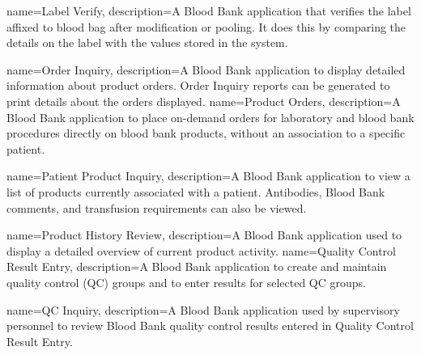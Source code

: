
\newcommand{\bbappitem}[1]{\item \appicon{bb/#1}  {{\Large{\boldcap{\gls{#1}}}}\\}\glsdesc{#1} }


{
    name={Label Verify},
    description={A Blood Bank application that verifies the label affixed to blood bag after modification or pooling. It does this by comparing the details on the label with the values stored in the system.}
}


{
  name={Order Inquiry},
  description={A Blood Bank application to display detailed information about product orders. Order Inquiry reports can be generated to print details about the orders displayed.}
}
{
  name={Product Orders},
  description={A Blood Bank application to place on-demand orders for laboratory and blood bank procedures directly on blood bank products, without an association to a specific patient.}
}

{
  name={Patient Product Inquiry},
  description={A Blood Bank application to view a list of products currently associated with a patient. Antibodies, Blood Bank comments, and transfusion requirements can also be viewed.}
}

{
  name={Product History Review},
  description={A Blood Bank application used to display a detailed overview of current product activity.}
}
{
  name={Quality Control Result Entry},
  description={A Blood Bank application to create and maintain quality control (QC) groups and to enter results for selected QC groups.}
}

{
  name={QC Inquiry},
  description={A Blood Bank application used by supervisory personnel to review Blood Bank quality control results entered in Quality Control Result Entry.}
}

